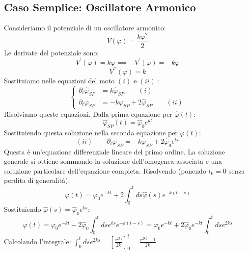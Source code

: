 \subsection{Caso Semplice: Oscillatore Armonico}
Consideriamo il potenziale di un oscillatore armonico:
\begin{equation}
V(\varphi)=\frac{k\varphi^{2}}{2}
\end{equation}
Le derivate del potenziale sono:
\begin{equation}
V^{\prime}(\varphi)=k\varphi \implies -V^{\prime}(\varphi)=-k\varphi
\end{equation}
\begin{equation}
V^{\prime\prime}(\varphi)=k
\end{equation}
Sostituiamo nelle equazioni del moto $(i)$ e $(ii)$ :
\begin{equation}
\begin{cases} 
\partial_{t} \hat{\varphi}_{SP}  &= k\hat{\varphi}_{SP}  \quad \quad(i) \\  
\partial_{t} \varphi_{SP}  &= -k\varphi_{SP} +2 \hat{\varphi}_{SP}   \quad \quad(ii)   
\end{cases}
\end{equation}
Risolviamo queste equazioni.
Dalla prima equazione per $\hat{\varphi}(t)$:
\begin{equation}
\hat{\varphi}_{SP}(t)=\hat{\varphi}_{0}e^{kt}
\end{equation}
Sostituiendo questa soluzione nella seconda equazione per $\varphi(t)$:
\begin{equation*}
(ii) \quad \quad  \partial_{t} \varphi_{SP}  = -k\varphi_{SP} +2 \hat{\varphi}_{0}e^{kt}
\end{equation*}
Questa è un'equazione differenziale lineare del primo ordine. La soluzione generale si ottiene sommando la soluzione dell'omogenea associata e una soluzione particolare dell'equazione completa.
Risolvendo (ponendo $t_0=0$ senza perdita di generalità):
\begin{equation}
\varphi(t)=\varphi_{0}e^{-kt}+2\int_{0}^{t}ds\hat{\varphi}(s)e^{-k(t-s)}
\end{equation}
Sostituiendo $\hat{\varphi}(s)=\hat{\varphi}_{0}e^{ks}$:
\begin{equation}
\varphi(t)=\varphi_{0}e^{-kt}+2\hat{\varphi}_{0}\int_{0}^{t}dse^{ks}e^{-k(t-s)} = \varphi_{0}e^{-kt}+2\hat{\varphi}_{0}e^{-kt}\int_{0}^{t}dse^{2ks}
\end{equation}
Calcolando l'integrale: $\int_{0}^{t}dse^{2ks} = \left[\frac{e^{2ks}}{2k}\right]_0^t = \frac{e^{2kt}-1}{2k}$
